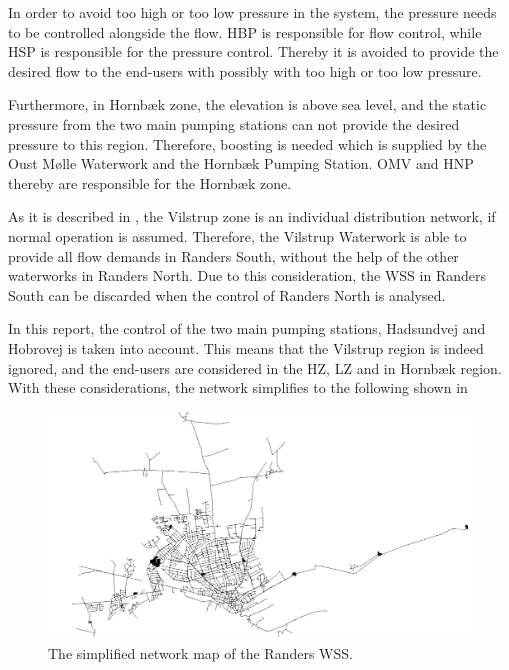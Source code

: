 In order to avoid too high or too low pressure in the system, the pressure needs to be controlled alongside the flow. HBP is responsible for flow control, while HSP is responsible for the pressure control. Thereby it is avoided to provide the desired flow to the end-users with possibly with too high or too low pressure. 

Furthermore, in Hornbæk zone, the elevation is above sea level, and the static pressure from the two main pumping stations can not provide the desired pressure to this region. Therefore, boosting is needed which is supplied by the Oust Mølle Waterwork and the Hornbæk Pumping Station. OMV and HNP thereby are responsible for the Hornbæk zone.

As it is described in , the Vilstrup zone is an individual distribution network, if normal operation is assumed. Therefore, the Vilstrup Waterwork is able to provide all flow demands in Randers South, without the help of the other waterworks in Randers North. Due to this consideration, the WSS in Randers South can be discarded when the control of Randers North is analysed. 

In this report, the control of the two main pumping stations, Hadsundvej and Hobrovej is taken into account. This means that the Vilstrup region is indeed ignored, and the end-users are considered in the HZ, LZ and in Hornbæk region. With these considerations, the network simplifies to the following shown in 

\begin{figure}[H]
\centering
\includegraphics[width=1.02\textwidth]{report/pictures/verdo_pic2}
\caption{The simplified network map of the Randers WSS.}
\label{fig:simplified_network}
\end{figure}

